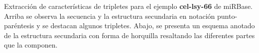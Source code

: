 \label{triplet}
Extracción de características de tripletes para el
ejemplo \textbf{cel-lsy-66} de miRBase. Arriba se observa la secuencia
y la estructura secundaria en notación punto-paréntesis y se destacan
algunos tripletes.  Abajo, se presenta un esquema anotado de la
estructura secundaria con forma de horquilla resaltando las diferentes
partes que la componen.

